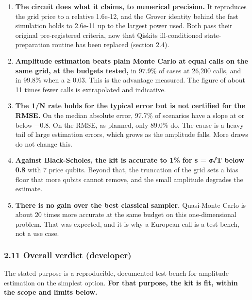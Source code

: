 \documentclass[
  10pt,
]{article}
\providecommand{\tightlist}{%
  \setlength{\itemsep}{0pt}\setlength{\parskip}{0pt}}
\begin{document}
\begin{enumerate}
\def\labelenumi{\arabic{enumi}.}
\tightlist
\item
  \textbf{The circuit does what it claims, to numerical precision.} It
  reproduces the grid price to a relative 1.6e-12, and the Grover
  identity behind the fast simulation holds to 2.6e-11 up to the largest
  power used. Both pass their original pre-registered criteria, now that
  Qiskit\textquotesingle s ill-conditioned state-preparation routine has
  been replaced (section 2.4).
\item
  \textbf{Amplitude estimation beats plain Monte Carlo at equal calls on
  the same grid, at the budgets tested,} in 97.9\% of cases at 26,200
  calls, and in 99.8\% when a ≥ 0.03. This is the advantage measured.
  The figure of about 11 times fewer calls is extrapolated and
  indicative.
\item
  \textbf{The 1/N rate holds for the typical error but is not certified
  for the RMSE.} On the median absolute error, 97.7\% of scenarios have
  a slope at or below −0.8. On the RMSE, as planned, only 89.0\% do. The
  cause is a heavy tail of large estimation errors, which grows as the
  amplitude falls. More draws do not change this.
\item
  \textbf{Against Black-Scholes, the kit is accurate to 1\% for s = σ√T
  below 0.8} with 7 price qubits. Beyond that, the truncation of the
  grid sets a bias floor that more qubits cannot remove, and the small
  amplitude degrades the estimate.
\item
  \textbf{There is no gain over the best classical sampler.} Quasi-Monte
  Carlo is about 20 times more accurate at the same budget on this
  one-dimensional problem. That was expected, and it is why a European
  call is a test bench, not a use case.
\end{enumerate}

\hypertarget{211-overall-verdict-developer}{%
\subsubsection{2.11 Overall verdict
(developer)}\label{211-overall-verdict-developer}}

The stated purpose is a reproducible, documented test bench for
amplitude estimation on the simplest option. \textbf{For that purpose,
the kit is fit, within the scope and limits below.}
\end{document}
